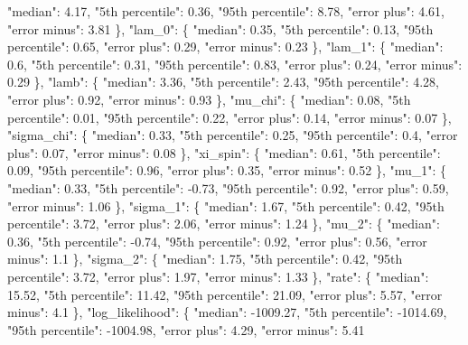 {{          "median": 4.17, %
          "5th percentile": 0.36, %
          "95th percentile": 8.78, %
          "error plus": 4.61, %
          "error minus": 3.81%
        \}, %
        "lam\_0": \{%
          "median": 0.35, %
          "5th percentile": 0.13, %
          "95th percentile": 0.65, %
          "error plus": 0.29, %
          "error minus": 0.23%
        \}, %
        "lam\_1": \{%
          "median": 0.6, %
          "5th percentile": 0.31, %
          "95th percentile": 0.83, %
          "error plus": 0.24, %
          "error minus": 0.29%
        \}, %
        "lamb": \{%
          "median": 3.36, %
          "5th percentile": 2.43, %
          "95th percentile": 4.28, %
          "error plus": 0.92, %
          "error minus": 0.93%
        \}, %
        "mu\_chi": \{%
          "median": 0.08, %
          "5th percentile": 0.01, %
          "95th percentile": 0.22, %
          "error plus": 0.14, %
          "error minus": 0.07%
        \}, %
        "sigma\_chi": \{%
          "median": 0.33, %
          "5th percentile": 0.25, %
          "95th percentile": 0.4, %
          "error plus": 0.07, %
          "error minus": 0.08%
        \}, %
        "xi\_spin": \{%
          "median": 0.61, %
          "5th percentile": 0.09, %
          "95th percentile": 0.96, %
          "error plus": 0.35, %
          "error minus": 0.52%
        \}, %
        "mu\_1": \{%
          "median": 0.33, %
          "5th percentile": {-}0.73, %
          "95th percentile": 0.92, %
          "error plus": 0.59, %
          "error minus": 1.06%
        \}, %
        "sigma\_1": \{%
          "median": 1.67, %
          "5th percentile": 0.42, %
          "95th percentile": 3.72, %
          "error plus": 2.06, %
          "error minus": 1.24%
        \}, %
        "mu\_2": \{%
          "median": 0.36, %
          "5th percentile": {-}0.74, %
          "95th percentile": 0.92, %
          "error plus": 0.56, %
          "error minus": 1.1%
        \}, %
        "sigma\_2": \{%
          "median": 1.75, %
          "5th percentile": 0.42, %
          "95th percentile": 3.72, %
          "error plus": 1.97, %
          "error minus": 1.33%
        \}, %
        "rate": \{%
          "median": 15.52, %
          "5th percentile": 11.42, %
          "95th percentile": 21.09, %
          "error plus": 5.57, %
          "error minus": 4.1%
        \}, %
        "log\_likelihood": \{%
          "median": {-}1009.27, %
          "5th percentile": {-}1014.69, %
          "95th percentile": {-}1004.98, %
          "error plus": 4.29, %
          "error minus": 5.41%
}}
